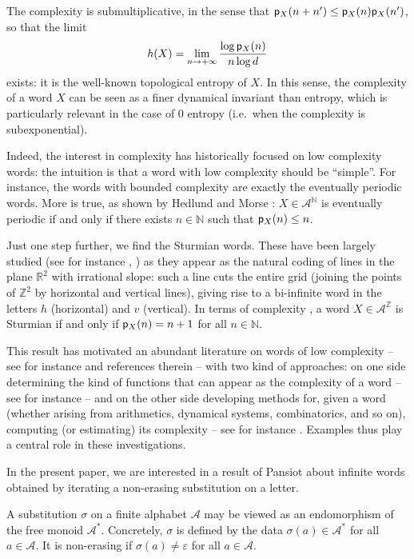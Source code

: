 \documentclass[11pt]{amsart}
\theoremstyle{remark}
\newcommand{\cp}{{\sf  p}}
\newcommand{\Z}{{\mathbb {Z}}}
\newcommand {\N} {{\mathbb {N}}}
\newcommand {\R} {{\mathbb {R}}}
\begin{document}
 The complexity is submultiplicative,   in the sense that $\cp_X(n+n')\le \cp_X(n)\cp_X(n')$, so that the limit
 $$h(X)=\lim_{n\rightarrow+\infty}\frac{\log \cp_X(n)}{n\log d}$$
exists: it is the well-known topological entropy of $X$.
In this sense, the complexity of a word $X$ can be seen as a finer dynamical invariant than entropy, which is  particularly relevant in the case of $0$ entropy (i.e.\ when the complexity is subexponential).

Indeed, the interest in complexity has historically focused on low complexity words: the intuition is that a word with low complexity should be ``simple''. 
For instance, the words with bounded complexity are exactly the eventually periodic words. More is true, as shown by Hedlund and Morse \cite{morse} :  $X\in \mathcal A^\N$ is eventually periodic if and only if there exists $n\in\N$ such that  $\cp_X(n)\le n$.
 
Just one step further, we find the Sturmian words. These   have been largely studied (see for instance \cite[chapter 2]{Lothaire}, \cite{Series}) as they appear as the natural coding of lines in the plane $\R^2$ with irrational slope: such a line cuts the entire grid (joining the points of $\Z^2$ by horizontal and vertical lines), giving rise to a bi-infinite word in the letters $h$ (horizontal) and $v$ (vertical). 
In terms of complexity \cite{morse}, a word $X\in \mathcal A^\Z$ is Sturmian if and only if $\cp_X(n)=n+1$ for all $n\in \N$.

This result has motivated an   abundant literature on words of low complexity -- see for instance \cite{Allouche,Cassaigne-Nicolas-in-CANT, Ferenczi} and references therein --
with two kind of approaches: 
on one side determining the kind of functions that can appear as the complexity of a word
-- see for instance \cite{Cassaigne_Kyoto-2002, Ferenczi,  Mauduit-Moreira} -- 
and on the other side developing methods for, given a word (whether arising from    arithmetics, dynamical systems, combinatorics, and so on), computing (or estimating) its complexity
-- see for instance \cite{Cassaigne_Bull-Belg-97}.
 Examples thus play  a central role in these investigations.

In the present paper, we are interested in a result of Pansiot \cite{pansiot} about  
   infinite words obtained by iterating a non-erasing substitution on a letter.
 
A substitution $\sigma$ on a finite alphabet $\mathcal A$ may be viewed as an endomorphism of the free monoid $\mathcal A^*$. Concretely, $\sigma$ is defined by the data $\sigma(a)\in\mathcal A^*$ for all $a\in\mathcal A$. It is non-erasing if $\sigma(a)\neq\varepsilon$ for all $a\in\mathcal A$. 
\end{document}
